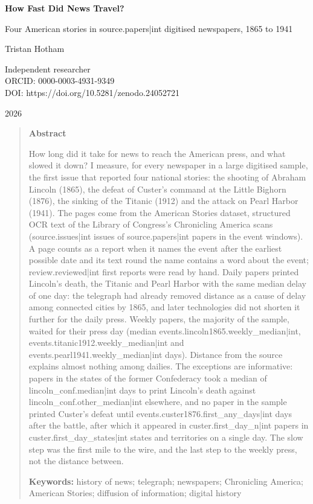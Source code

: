 \documentclass[11pt,a4paper]{article}
\begin{document}
\begin{center}
{\Large\bfseries How Fast Did News Travel?\par}
\vspace{0.4em}
{\large Four American stories in {{source.papers|int}} digitised newspapers, 1865 to 1941\par}
\vspace{1.2em}
{\large Tristan Hotham\par}
\vspace{0.3em}
{\small Independent researcher\\
ORCID: 0000-0003-4931-9349\\
DOI: https://doi.org/10.5281/zenodo.24052721\par}
\vspace{0.8em}
2026
\end{center}

\begin{quote}
\small
\begin{center}\textbf{Abstract}\end{center}
How long did it take for news to reach the American press, and what slowed it down? I measure, for every newspaper in a large digitised sample, the first issue that reported four national stories: the shooting of Abraham Lincoln (1865), the defeat of Custer's command at the Little Bighorn (1876), the sinking of the Titanic (1912) and the attack on Pearl Harbor (1941). The pages come from the American Stories dataset, structured OCR text of the Library of Congress's Chronicling America scans ({{source.issues|int}} issues of {{source.papers|int}} papers in the event windows). A page counts as a report when it names the event after the earliest possible date and its text round the name contains a word about the event; {{review.reviewed|int}} first reports were read by hand. Daily papers printed Lincoln's death, the Titanic and Pearl Harbor with the same median delay of one day: the telegraph had already removed distance as a cause of delay among connected cities by 1865, and later technologies did not shorten it further for the daily press. Weekly papers, the majority of the sample, waited for their press day (median {{events.lincoln1865.weekly_median|int}}, {{events.titanic1912.weekly_median|int}} and {{events.pearl1941.weekly_median|int}} days). Distance from the source explains almost nothing among dailies. The exceptions are informative: papers in the states of the former Confederacy took a median of {{lincoln_conf.median|int}} days to print Lincoln's death against {{lincoln_conf.other_median|int}} elsewhere, and no paper in the sample printed Custer's defeat until {{events.custer1876.first_any_days|int}} days after the battle, after which it appeared in {{custer.first_day_n|int}} papers in {{custer.first_day_states|int}} states and territories on a single day. The slow step was the first mile to the wire, and the last step to the weekly press, not the distance between.

\textbf{Keywords:} history of news; telegraph; newspapers; Chronicling America; American Stories; diffusion of information; digital history
\end{quote}
\end{document}

